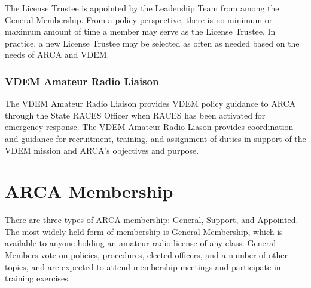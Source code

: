 \documentclass[pdflatex,letterpaper,twoside,12pt]{book}
\begin{document}
The License Trustee is appointed by the Leadership Team from among the General Membership.  From a policy perspective, there is no minimum or maximum amount of time a member may serve as the License Trustee.  In practice, a new License Trustee may be selected as often as needed based on the needs of ARCA and VDEM.

\subsection{VDEM Amateur Radio Liaison}

The VDEM Amateur Radio Liaison provides VDEM policy guidance to ARCA through the State RACES Officer when RACES has been activated for emergency response. The VDEM Amateur Radio Liason provides coordination and guidance for recruitment, training, and assignment of duties in support of the VDEM mission and ARCA's objectives and purpose.

% 
% 
% 


\chapter{ARCA Membership}

There are three types of ARCA membership:  General, Support, and Appointed.  The most widely held form of membership is General Membership, which is available to anyone holding an amateur radio license of any class.  General Members vote on policies, procedures, elected officers, and a number of other topics, and are expected to attend membership meetings and participate in training exercises.
\end{document}
